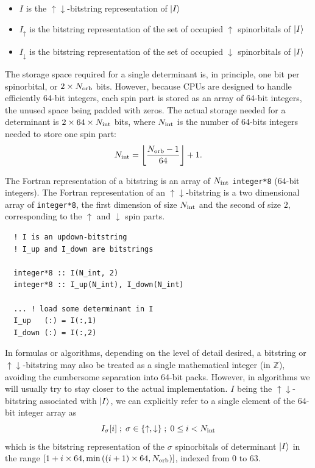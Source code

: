 \documentclass[./thesis.tex]{subfiles}
\begin{document}
\begin{itemize}
\item
$I$ is the $\uparrow\downarrow$-bitstring representation of $\ket{I}$
\item
$I_\uparrow$ is the bitstring representation of the set of occupied $\uparrow$ spinorbitals of $\ket{I}$ 
\item
$I_\downarrow$ is the bitstring representation of the set of occupied $\downarrow$ spinorbitals of $\ket{I}$ 

\end{itemize}


The storage space required for a single determinant is, in principle, one bit per spinorbital, or $2 \times {N_\text{orb}}$ bits. However, because CPUs are designed to handle efficiently 64-bit integers, each spin part is stored as an array of 64-bit integers, the unused space being padded with zeros. 
The actual storage needed for a determinant is $2 \times 64 \times {N_\text{int}}$ bits, where ${N_\text{int}}$ is the number of 64-bits integers needed to store one spin part:
\begin{equation}
{N_\text{int}} = \left \lfloor \frac{{N_\text{orb}}-1}{64} \right \rfloor + 1.
\end{equation}


The Fortran representation of a bitstring is an array of ${N_\text{int}}$ \lstinline{integer*8} (64-bit integers).  
The Fortran representation of an $\uparrow\downarrow$-bitstring is a two dimensional array of \lstinline{integer*8}, the first dimension of size ${N_\text{int}}$ and the second of size $2$, corresponding to the $\uparrow$ and $\downarrow$ spin parts.


\lstset{frame=single}
\begin{lstlisting}
  ! I is an updown-bitstring
  ! I_up and I_down are bitstrings
  
  integer*8 :: I(N_int, 2)
  integer*8 :: I_up(N_int), I_down(N_int)

  ... ! load some determinant in I
  I_up   (:) = I(:,1)
  I_down (:) = I(:,2)
\end{lstlisting}
\lstset{frame=none}


In formulas or algorithms, depending on the level of detail desired, a bitstring or $\uparrow\downarrow$-bitstring may also be treated as a single mathematical integer (in $\mathbb{Z}$), avoiding the cumbersome separation into 64-bit packs. However, in algorithms we will usually try to stay closer to the actual implementation. $I$ being the $\uparrow\downarrow$-bitstring associated with $\ket{I}$, we can explicitly refer to a single element of the 64-bit integer array as
\begin{equation}
I_{\sigma}[i]\; ;\; \sigma \in \{\uparrow, \downarrow\}\; ;\; 0 \le i < {N_\text{int}}
\end{equation}
which is the bitstring representation of the $\sigma$ spinorbitals of determinant $\ket{I}$ in the range $[1+i \times 64, \min \left( (i+1) \times 64, {N_\text{orb}} \right)]$, indexed from $0$ to $63$.
\end{document}
